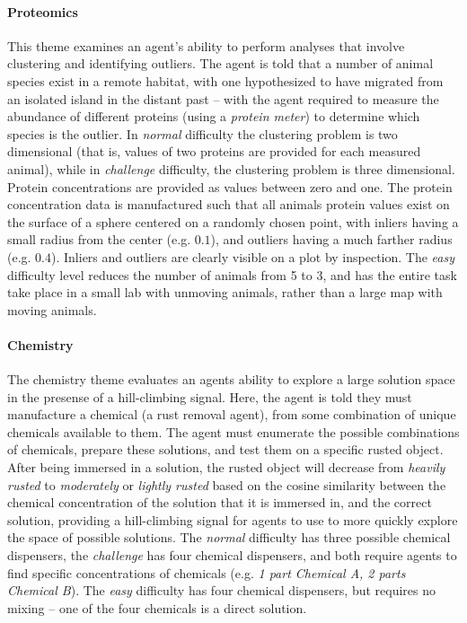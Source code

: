\paragraph{Proteomics} This theme examines an agent's ability to perform analyses that involve clustering and identifying outliers.  The agent is told that a number of animal species exist in a remote habitat, with one hypothesized to have migrated from an isolated island in the distant past -- with the agent required to measure the abundance of different proteins (using a \textit{protein meter}) to determine which species is the outlier.  In \textit{normal} difficulty the clustering problem is two dimensional (that is, values of two proteins are provided for each measured animal), while in \textit{challenge} difficulty, the clustering problem is three dimensional. Protein concentrations are provided as values between zero and one. The protein concentration data is manufactured such that all animals protein values exist on the surface of a sphere centered on a randomly chosen point, with inliers having a small radius from the center (e.g. $0.1$), and outliers having a much farther radius (e.g. $0.4$).  Inliers and outliers are clearly visible on a plot by inspection.  The \textit{easy} difficulty level reduces the number of animals from 5 to 3, and has the entire task take place in a small lab with unmoving animals, rather than a large map with moving animals.

\paragraph{Chemistry} The chemistry theme evaluates an agents ability to explore a large solution space in the presense of a hill-climbing signal.  Here, the agent is told they must manufacture a chemical (a rust removal agent), from some combination of unique chemicals available to them.  The agent must enumerate the possible combinations of chemicals, prepare these solutions, and test them on a specific rusted object.  After being immersed in a solution, the rusted object will decrease from \textit{heavily rusted} to \textit{moderately} or \textit{lightly rusted} based on the cosine similarity between the chemical concentration of the solution that it is immersed in, and the correct solution, providing a hill-climbing signal for agents to use to more quickly explore the space of possible solutions.  The \textit{normal} difficulty has three possible chemical dispensers, the \textit{challenge} has four chemical dispensers, and both require agents to find specific concentrations of chemicals (e.g. \textit{1 part Chemical A, 2 parts Chemical B}).  The \textit{easy} difficulty has four chemical dispensers, but requires no mixing -- one of the four chemicals is a direct solution.

